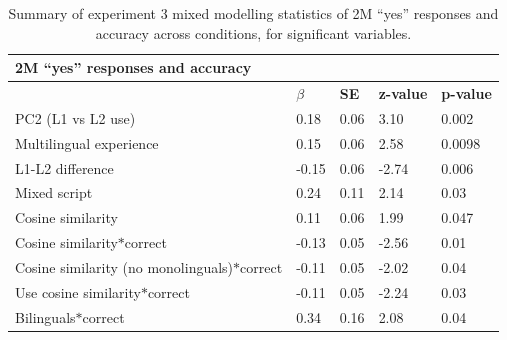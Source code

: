 \begin{table}[!htbp]
    \begin{center}
        \begin{tabular}{@{}lllll@{}}
            \toprule
            \multicolumn{5}{l}{\textbf{2M ``yes'' responses and accuracy}} \\ \midrule
            & \textbf{$\beta$} & \textbf{SE} & \textbf{z-value} & \textbf{p-value} \\ \midrule
            PC2 (L1 vs L2 use) & 0.18 & 0.06 & 3.10 & 0.002 \\ \midrule
            Multilingual experience & 0.15 & 0.06 & 2.58 & 0.0098 \\ \midrule
            L1-L2 difference & -0.15 & 0.06 & -2.74 & 0.006 \\ \midrule
            Mixed script & 0.24 & 0.11 & 2.14 & 0.03 \\ \midrule
            Cosine similarity & 0.11 & 0.06 & 1.99 & 0.047 \\ \midrule
            Cosine similarity$\ast$correct & -0.13 & 0.05 & -2.56 & 0.01 \\ \midrule
            Cosine similarity (no monolinguals)$\ast$correct & -0.11 & 0.05 & -2.02 & 0.04 \\ \midrule
            Use cosine similarity$\ast$correct & -0.11 & 0.05 & -2.24 & 0.03 \\ \midrule
            Bilinguals$\ast$correct & 0.34 & 0.16 & 2.08 & 0.04 \\ \bottomrule
        \end{tabular}
    \end{center}
    \caption{Summary of experiment 3 mixed modelling statistics of 2M ``yes'' responses and accuracy across conditions, for significant variables.}
    \label{exp3_2M_summary}
\end{table}
\break